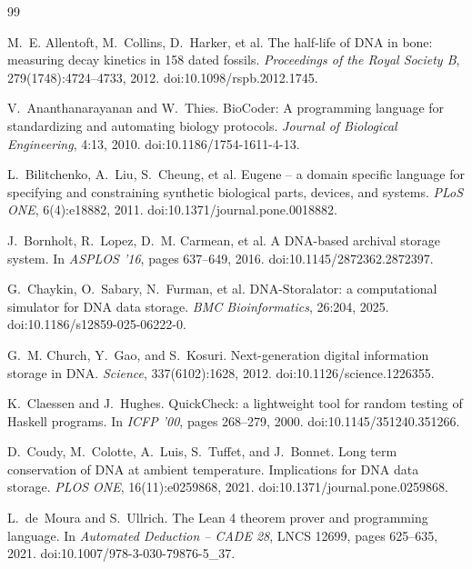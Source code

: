 \documentclass[11pt,a4paper]{article}
\begin{document}
\begin{thebibliography}{99}
\small

M.~E. Allentoft, M.~Collins, D.~Harker, et al.
\newblock The half-life of DNA in bone: measuring decay kinetics in 158 dated fossils.
\newblock \emph{Proceedings of the Royal Society B}, 279(1748):4724--4733, 2012.
\newblock doi:10.1098/rspb.2012.1745.

V.~Ananthanarayanan and W.~Thies.
\newblock BioCoder: A programming language for standardizing and automating biology protocols.
\newblock \emph{Journal of Biological Engineering}, 4:13, 2010.
\newblock doi:10.1186/1754-1611-4-13.

L.~Bilitchenko, A.~Liu, S.~Cheung, et al.
\newblock Eugene -- a domain specific language for specifying and constraining synthetic biological parts, devices, and systems.
\newblock \emph{PLoS ONE}, 6(4):e18882, 2011.
\newblock doi:10.1371/journal.pone.0018882.

J.~Bornholt, R.~Lopez, D.~M. Carmean, et al.
\newblock A DNA-based archival storage system.
\newblock In \emph{ASPLOS '16}, pages 637--649, 2016.
\newblock doi:10.1145/2872362.2872397.

G.~Chaykin, O.~Sabary, N.~Furman, et al.
\newblock DNA-Storalator: a computational simulator for DNA data storage.
\newblock \emph{BMC Bioinformatics}, 26:204, 2025.
\newblock doi:10.1186/s12859-025-06222-0.

G.~M. Church, Y.~Gao, and S.~Kosuri.
\newblock Next-generation digital information storage in DNA.
\newblock \emph{Science}, 337(6102):1628, 2012.
\newblock doi:10.1126/science.1226355.

K.~Claessen and J.~Hughes.
\newblock QuickCheck: a lightweight tool for random testing of Haskell programs.
\newblock In \emph{ICFP '00}, pages 268--279, 2000.
\newblock doi:10.1145/351240.351266.

D.~Coudy, M.~Colotte, A.~Luis, S.~Tuffet, and J.~Bonnet.
\newblock Long term conservation of DNA at ambient temperature. Implications for DNA data storage.
\newblock \emph{PLOS ONE}, 16(11):e0259868, 2021.
\newblock doi:10.1371/journal.pone.0259868.

L.~de~Moura and S.~Ullrich.
\newblock The Lean 4 theorem prover and programming language.
\newblock In \emph{Automated Deduction -- CADE 28}, LNCS 12699, pages 625--635, 2021.
\newblock doi:10.1007/978-3-030-79876-5\_37.


\end{thebibliography}
\end{document}
